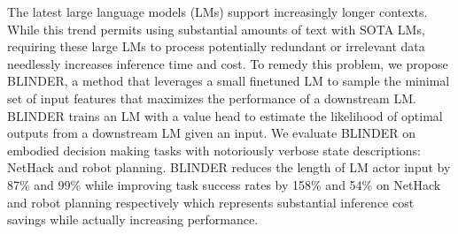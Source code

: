 The latest large language models (LMs) support increasingly longer contexts. While this trend permits using substantial amounts of text with SOTA LMs, requiring these large LMs to process potentially redundant or irrelevant data needlessly increases inference time and cost. To remedy this problem, we propose BLINDER, a method that leverages a small finetuned LM to sample the minimal set of input features that maximizes the performance of a downstream LM. BLINDER trains an LM with a value head to estimate the likelihood of optimal outputs from a downstream LM given an input. We evaluate BLINDER on embodied decision making tasks with notoriously verbose state descriptions: NetHack and robot planning. BLINDER reduces the length of LM actor input by 87\% and 99\% while improving task success rates by 158\% and 54\% on NetHack and robot planning respectively which represents substantial inference cost savings while actually increasing performance.